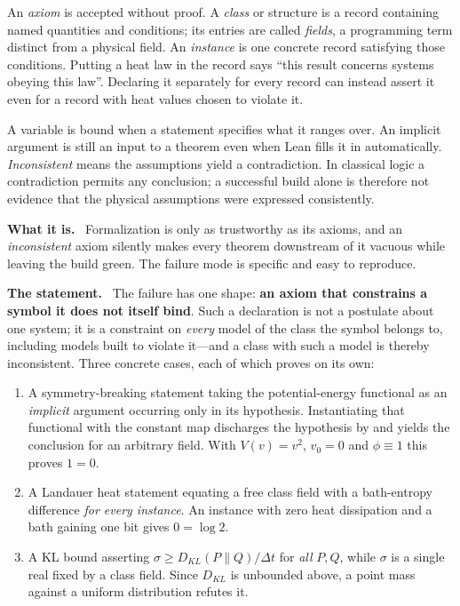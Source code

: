 \documentclass[11pt]{article}
\newcommand{\what}{\par\smallskip\noindent\textbf{What it is.}\ }
\newcommand{\statement}{\par\smallskip\noindent\textbf{The statement.}\ }
\newcommand{\id}[1]{{\small\ttfamily\seqsplit{#1}}}
\begin{document}
An \emph{axiom} is accepted without proof. A \emph{class} or structure is a
record containing named quantities and conditions; its entries are called
\emph{fields}, a programming term distinct from a physical field. An
\emph{instance} is one concrete record satisfying those conditions.
Putting a heat law in the record says ``this result concerns systems obeying
this law''. Declaring it separately for every record can instead assert it
even for a record with heat values chosen to violate it.

A variable is bound when a statement specifies what it ranges over.
An implicit argument is still an input to a theorem even when Lean fills it
in automatically. \emph{Inconsistent} means the assumptions yield a
contradiction. In classical logic a contradiction permits any conclusion;
a successful build alone is therefore not evidence that the physical
assumptions were expressed consistently.

\what
Formalization is only as trustworthy as its axioms, and an \emph{inconsistent}
axiom silently makes every theorem downstream of it vacuous while leaving the
build green. The failure mode is specific and easy to reproduce.

\statement
The failure has one shape: \textbf{an axiom that constrains a symbol it does
not itself bind}. Such a declaration is not a postulate about one system; it is
a constraint on \emph{every} model of the class the symbol belongs to,
including models built to violate it---and a class with such a model is thereby
inconsistent. Three concrete cases, each of which proves \id{False} on its own:

\begin{enumerate}[leftmargin=*]
\item A symmetry-breaking statement taking the potential-energy functional as
an \emph{implicit} argument occurring only in its hypothesis. Instantiating
that functional with the constant map discharges the hypothesis by \id{rfl} and
yields the conclusion for an arbitrary field. With $V(v)=v^2$, $v_0=0$ and
$\phi\equiv1$ this proves $1=0$.
\item A Landauer heat statement equating a free class field with a
bath-entropy difference \emph{for every instance}. An instance with zero heat
dissipation and a bath gaining one bit gives $0=\log2$.
\item A KL bound asserting $\sigma\ge D_{KL}(P\|Q)/\Delta t$ for \emph{all}
$P,Q$, while $\sigma$ is a single real fixed by a class field. Since $D_{KL}$
is unbounded above, a point mass against a uniform distribution refutes it.
\end{enumerate}
\end{document}
